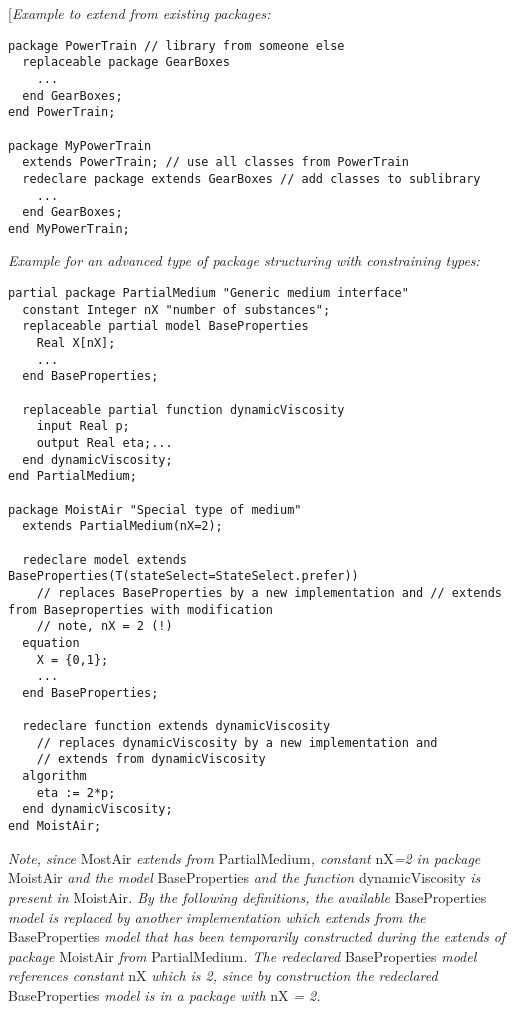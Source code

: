 {[}\emph{Example to extend from existing packages:}
\begin{lstlisting}[language=modelica]
package PowerTrain // library from someone else
  replaceable package GearBoxes
    ...
  end GearBoxes;
end PowerTrain;

package MyPowerTrain
  extends PowerTrain; // use all classes from PowerTrain
  redeclare package extends GearBoxes // add classes to sublibrary
    ...
  end GearBoxes;
end MyPowerTrain;
\end{lstlisting}

\emph{Example for an advanced type of package structuring with
constraining types:}
\begin{lstlisting}[language=modelica]
partial package PartialMedium "Generic medium interface"
  constant Integer nX "number of substances";
  replaceable partial model BaseProperties
    Real X[nX];
    ...
  end BaseProperties;

  replaceable partial function dynamicViscosity
    input Real p;
    output Real eta;...
  end dynamicViscosity;
end PartialMedium;

package MoistAir "Special type of medium"
  extends PartialMedium(nX=2);

  redeclare model extends BaseProperties(T(stateSelect=StateSelect.prefer))
    // replaces BaseProperties by a new implementation and // extends from Baseproperties with modification
    // note, nX = 2 (!)
  equation
    X = {0,1};
    ...
  end BaseProperties;

  redeclare function extends dynamicViscosity
    // replaces dynamicViscosity by a new implementation and
    // extends from dynamicViscosity
  algorithm
    eta := 2*p;
  end dynamicViscosity;
end MoistAir;
\end{lstlisting}

\emph{Note, since} MostAir \emph{extends from} PartialMedium\emph{,
constant} nX\emph{=2 in package} MoistAir \emph{and the model}
BaseProperties \emph{and the function} dynamicViscosity \emph{is present
in} MoistAir\emph{. By the following definitions, the available}
BaseProperties \emph{model is replaced by another implementation which
extends from the} BaseProperties \emph{model that has been temporarily
constructed during the extends of package} MoistAir \emph{from}
PartialMedium\emph{. The redeclared} BaseProperties \emph{model
references constant} nX \emph{which is 2, since by construction the
redeclared} BaseProperties \emph{model is in a package with} nX \emph{=
2.}

